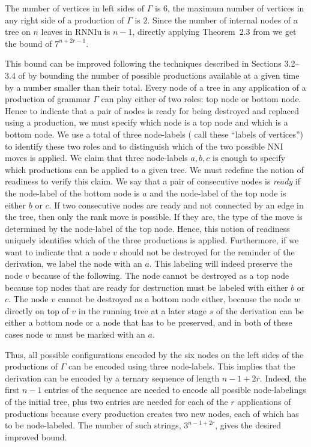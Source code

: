 \documentclass[11pt]{amsart}
\theoremstyle{definition}
\newcommand{\nni}{\mathrm{NNI}}
\newcommand{\rnniu}{\mathrm{RNNIu}}
\begin{document}
The number of vertices in left sides of $\Gamma$ is $6$, the maximum number of vertices in any right side of a production of $\Gamma$ is $2$.
Since the number of internal nodes of a tree on $n$ leaves in $\rnniu$ is $n-1$, directly applying Theorem~2.3 from \autocite{Sleator1992-bp} we get the bound of $7^{n+2r-1}$.

This bound can be improved following the techniques described in Sections 3.2--3.4 of \autocite[][see also Section 5]{Sleator1992-bp} by bounding the number of possible productions available at a given time by a number smaller than their total.
Every node of a tree in any application of a production of grammar $\Gamma$ can play either of two roles: top node or bottom node.
Hence to indicate that a pair of nodes is ready for being destroyed and replaced using a production, we must specify which node is a top node and which is a bottom node.
We use a total of three node-labels (\textcite{Sleator1992-bp} call these ``labels of vertices'') to identify these two roles and to distinguish which of the two possible $\nni$ moves is applied.
We claim that three node-labels $a, b, c$ is enough to specify which productions can be applied to a given tree.
We must redefine the notion of readiness to verify this claim.
We say that a pair of consecutive nodes is \emph{ready} if the node-label of the bottom node is $a$ and the node-label of the top node is either $b$ or $c$.
If two consecutive nodes are ready and not connected by an edge in the tree, then only the rank move is possible.
If they are, the type of the move is determined by the node-label of the top node.
Hence, this notion of readiness uniquely identifies which of the three productions is applied.
Furthermore, if we want to indicate that a node $v$ should not be destroyed for the reminder of the derivation, we label the node with an $a$.
This labeling will indeed preserve the node $v$ because of the following.
The node cannot be destroyed as a top node because top nodes that are ready for destruction must be labeled with either $b$ or $c$.
The node $v$ cannot be destroyed as a bottom node either, because the node $w$ directly on top of $v$ in the running tree at a later stage $s$ of the derivation can be either a bottom node or a node that has to be preserved, and in both of these cases node $w$ must be marked with an $a$.

Thus, all possible configurations encoded by the six nodes on the left sides of the productions of $\Gamma$ can be encoded using three node-labels.
This implies that the derivation can be encoded by a ternary sequence of length $n-1+2r$.
Indeed, the first $n-1$ entries of the sequence are needed to encode all possible node-labelings of the initial tree, plus two entries are needed for each of the $r$ applications of productions because every production creates two new nodes, each of which has to be node-labeled.
The number of such strings, $3^{n-1+2r}$, gives the desired improved bound.
\end{document}
